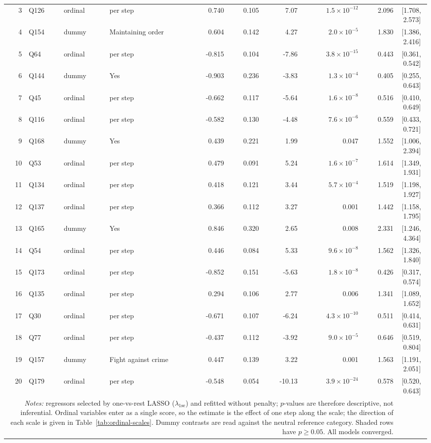 \begin{landscape}
\begin{longtable}{r l l l r r r r r c}
3 & Q126 & ordinal & per step & 0.740 & 0.105 & 7.07 & $1.5{\times}10^{-12}$ & 2.096 & [1.708,\,2.573] &  \\
4 & Q154 & dummy & Maintaining order & 0.604 & 0.142 & 4.27 & $2.0{\times}10^{-5}$ & 1.830 & [1.386,\,2.416] &  \\
5 & Q64 & ordinal & per step & -0.815 & 0.104 & -7.86 & $3.8{\times}10^{-15}$ & 0.443 & [0.361,\,0.542] &  \\
6 & Q144 & dummy & Yes & -0.903 & 0.236 & -3.83 & $1.3{\times}10^{-4}$ & 0.405 & [0.255,\,0.643] &  \\
7 & Q45 & ordinal & per step & -0.662 & 0.117 & -5.64 & $1.6{\times}10^{-8}$ & 0.516 & [0.410,\,0.649] &  \\
8 & Q116 & ordinal & per step & -0.582 & 0.130 & -4.48 & $7.6{\times}10^{-6}$ & 0.559 & [0.433,\,0.721] &  \\
9 & Q168 & dummy & Yes & 0.439 & 0.221 & 1.99 & 0.047 & 1.552 & [1.006,\,2.394] &  \\
10 & Q53 & ordinal & per step & 0.479 & 0.091 & 5.24 & $1.6{\times}10^{-7}$ & 1.614 & [1.349,\,1.931] &  \\
11 & Q134 & ordinal & per step & 0.418 & 0.121 & 3.44 & $5.7{\times}10^{-4}$ & 1.519 & [1.198,\,1.927] &  \\
12 & Q137 & ordinal & per step & 0.366 & 0.112 & 3.27 & 0.001 & 1.442 & [1.158,\,1.795] &  \\
13 & Q165 & dummy & Yes & 0.846 & 0.320 & 2.65 & 0.008 & 2.331 & [1.246,\,4.364] &  \\
14 & Q54 & ordinal & per step & 0.446 & 0.084 & 5.33 & $9.6{\times}10^{-8}$ & 1.562 & [1.326,\,1.840] &  \\
15 & Q173 & ordinal & per step & -0.852 & 0.151 & -5.63 & $1.8{\times}10^{-8}$ & 0.426 & [0.317,\,0.574] &  \\
16 & Q135 & ordinal & per step & 0.294 & 0.106 & 2.77 & 0.006 & 1.341 & [1.089,\,1.652] &  \\
17 & Q30 & ordinal & per step & -0.671 & 0.107 & -6.24 & $4.3{\times}10^{-10}$ & 0.511 & [0.414,\,0.631] &  \\
18 & Q77 & ordinal & per step & -0.437 & 0.112 & -3.92 & $9.0{\times}10^{-5}$ & 0.646 & [0.519,\,0.804] &  \\
19 & Q157 & dummy & Fight against crime & 0.447 & 0.139 & 3.22 & 0.001 & 1.563 & [1.191,\,2.051] &  \\
20 & Q179 & ordinal & per step & -0.548 & 0.054 & -10.13 & $3.9{\times}10^{-24}$ & 0.578 & [0.520,\,0.643] &  \\
\multicolumn{9}{p{0.95\linewidth}}{\footnotesize \emph{Notes:} regressors selected by one-vs-rest LASSO ($\lambda_{1\text{se}}$) and refitted without penalty; $p$-values are therefore descriptive, not inferential. Ordinal variables enter as a single score, so the estimate is the effect of one step along the scale; the direction of each scale is given in Table~\ref{tab:ordinal-scales}. Dummy contrasts are read against the neutral reference category. Shaded rows have $p \geq 0.05$. All models converged.}\\
\end{longtable}
\endgroup
\end{landscape}
